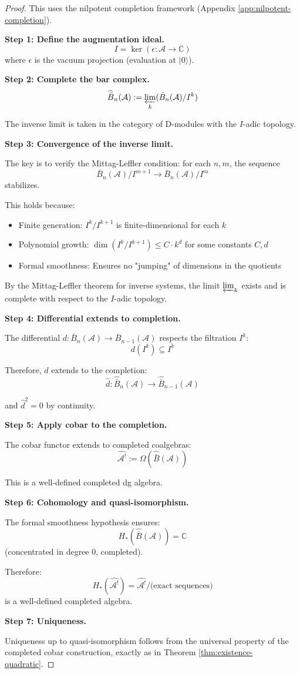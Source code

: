 \begin{proof}
This uses the nilpotent completion framework (Appendix \ref{app:nilpotent-completion}).

\textbf{Step 1: Define the augmentation ideal.}
$$I = \ker(\epsilon: \mathcal{A} \to \mathbb{C})$$
where $\epsilon$ is the vacuum projection (evaluation at $|0\rangle$).

\textbf{Step 2: Complete the bar complex.}
$$\widehat{\bar{B}}_n(\mathcal{A}) := \varprojlim_k (\bar{B}_n(\mathcal{A}) / I^k)$$

The inverse limit is taken in the category of D-modules with the $I$-adic topology.

\textbf{Step 3: Convergence of the inverse limit.}

The key is to verify the Mittag-Leffler condition: for each $n, m$, the sequence
$$\bar{B}_n(\mathcal{A})/I^{m+1} \to \bar{B}_n(\mathcal{A})/I^m$$
stabilizes.

This holds because:
\begin{itemize}
\item Finite generation: $I^k / I^{k+1}$ is finite-dimensional for each $k$
\item Polynomial growth: $\dim(I^k / I^{k+1}) \leq C \cdot k^d$ for some constants $C, d$
\item Formal smoothness: Ensures no "jumping" of dimensions in the quotients
\end{itemize}

By the Mittag-Leffler theorem for inverse systems, the limit $\varprojlim_k$ exists and is complete with respect to the $I$-adic topology.

\textbf{Step 4: Differential extends to completion.}

The differential $d: \bar{B}_n(\mathcal{A}) \to \bar{B}_{n-1}(\mathcal{A})$ respects the filtration $I^k$:
$$d(I^k) \subseteq I^k$$

Therefore, $d$ extends to the completion:
$$\widehat{d}: \widehat{\bar{B}}_n(\mathcal{A}) \to \widehat{\bar{B}}_{n-1}(\mathcal{A})$$

and $\widehat{d}^2 = 0$ by continuity.

\textbf{Step 5: Apply cobar to the completion.}

The cobar functor extends to completed coalgebras:
$$\widehat{\mathcal{A}^!} := \Omega(\widehat{\bar{B}}(\mathcal{A}))$$

This is a well-defined completed dg algebra.

\textbf{Step 6: Cohomology and quasi-isomorphism.}

The formal smoothness hypothesis ensures:
$$H_*(\widehat{\bar{B}}(\mathcal{A})) = \mathbb{C}$$
(concentrated in degree 0, completed).

Therefore:
$$H_*(\widehat{\mathcal{A}^!}) = \widehat{\mathcal{A}^!} / \text{(exact sequences)}$$
is a well-defined completed algebra.

\textbf{Step 7: Uniqueness.}

Uniqueness up to quasi-isomorphism follows from the universal property of the completed cobar construction, exactly as in Theorem \ref{thm:existence-quadratic}.
\end{proof}

